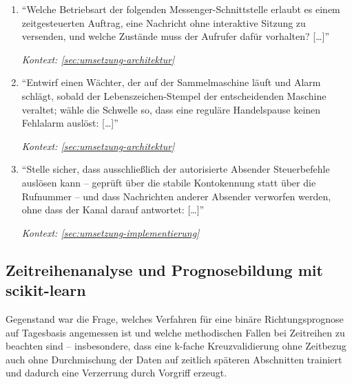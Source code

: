 \begin{enumerate}
    \item \enquote{Welche Betriebsart der folgenden Messenger-Schnittstelle
            erlaubt es einem zeitgesteuerten Auftrag, eine Nachricht ohne
            interaktive Sitzung zu versenden, und welche Zustände muss der
            Aufrufer dafür vorhalten? [\dots]}
            \par\hfill\textit{Kontext: \cref{sec:umsetzung-architektur}}

    \item \enquote{Entwirf einen Wächter, der auf der Sammelmaschine läuft
            und Alarm schlägt, sobald der Lebenszeichen-Stempel der
            entscheidenden Maschine veraltet; wähle die Schwelle so, dass
            eine reguläre Handelspause keinen Fehlalarm auslöst: [\dots]}
            \par\hfill\textit{Kontext: \cref{sec:umsetzung-architektur}}

    \item \enquote{Stelle sicher, dass ausschließlich der autorisierte
            Absender Steuerbefehle auslösen kann -- geprüft über die stabile
            Kontokennung statt über die Rufnummer -- und dass Nachrichten
            anderer Absender verworfen werden, ohne dass der Kanal darauf
            antwortet: [\dots]}
            \par\hfill\textit{Kontext: \cref{sec:umsetzung-implementierung}}
\end{enumerate}

\subsection{Zeitreihenanalyse und Prognosebildung mit scikit-learn}
\label{sec:prompts-fable-scikit}

Gegenstand war die Frage, welches Verfahren für eine binäre Richtungsprognose
auf Tagesbasis angemessen ist und welche methodischen Fallen bei Zeitreihen zu
beachten sind -- insbesondere, dass eine k-fache Kreuzvalidierung ohne
Zeitbezug auch ohne Durchmischung der Daten auf zeitlich späteren Abschnitten
trainiert und dadurch eine Verzerrung durch Vorgriff erzeugt.

